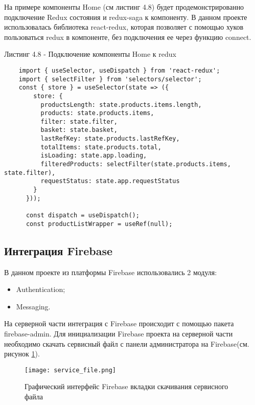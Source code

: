 \subsubsection{}

На примере компоненты Home (см листинг 4.8) будет продемонстрированно подключение Redux состояния и redux-saga к компоненту.
В данном проекте использовалась библиотека react-redux, которая позволяет с помощью хуков пользоваться redux в компоненте, без подключения ее через функцию connect.

Листинг 4.8 - Подключение компоненты Home к redux
\begin{lstlisting}
    import { useSelector, useDispatch } from 'react-redux';
    import { selectFilter } from 'selectors/selector';
    const { store } = useSelector(state => ({
        store: {
          productsLength: state.products.items.length,
          products: state.products.items,
          filter: state.filter,
          basket: state.basket,
          lastRefKey: state.products.lastRefKey,
          totalItems: state.products.total,
          isLoading: state.app.loading,
          filteredProducts: selectFilter(state.products.items, state.filter),
          requestStatus: state.app.requestStatus
        }
      }));

      const dispatch = useDispatch();
      const productListWrapper = useRef(null);

\end{lstlisting}


\subsection{Интеграция Firebase}
В данном проекте из платформы Firebase использовались 2 модуля:
\begin{itemize}
    \item Authentication;
    \item Messaging.
\end{itemize}

На серверной части интеграция с Firebase происходит с помощью пакета firebase-admin.
Для инициализации Firebase проекта на серверной части необходимо скачать сервисный файл с панели администратора на Firebase(см. рисунок \ref{fire:admin}).

\begin{figure}[ht]
    \centering
    \texttt{[image: service\_file.png]}
    \caption{ Графический интерфейс Firebase вкладки скачивания сервисного файла }
    \label{fire:admin}
\end{figure}

